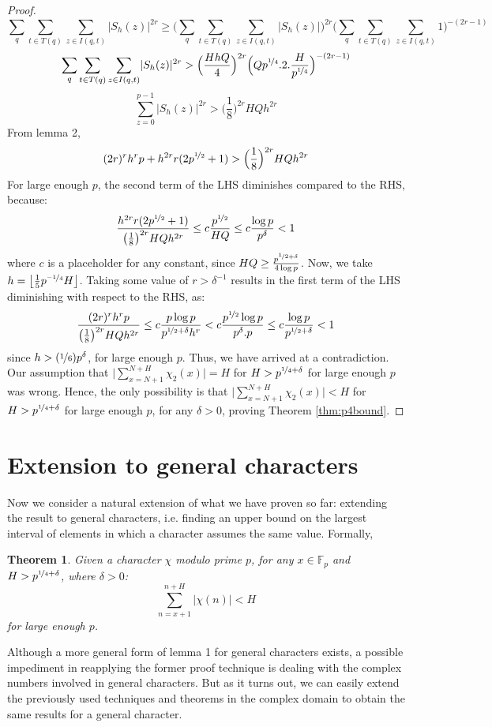 \documentclass{report}
\newtheorem{theorem}{Theorem}
\begin{document}
\begin{proof}
$$\sum_q\sum\limits_{t\in T(q)}\sum\limits_{z\in I(q,t)}\lvert S_h(z) \rvert^{2r} \geq \bigg ( \sum_q\sum\limits_{t\in T(q)}\sum\limits_{z\in I(q,t)}\lvert S_h(z) \rvert \bigg )^{2r} \bigg ( \sum_q\sum\limits_{t\in T(q)}\sum\limits_{z\in I(q,t)}1 \bigg )^{-(2r-1)}$$
$$\sum_q\sum\limits_{t\in T(q)}\sum\limits_{z\in I(q,t)}\lvert S_h(z) \rvert^{2r} > \Big( \frac{HhQ}{4}\Big)^{2r}\Big ( Qp^{\nicefrac{1}{4}}.2.\frac{H}{p^{\nicefrac{1}{4}}}\Big )^{-(2r-1)}$$
$$\sum\limits_{z=0}^{p-1}\lvert S_h(z) \rvert^{2r}>\Big(\frac{1}{8}\Big)^{2r}HQh^{2r}$$
From lemma 2,
$$(2r)^{r}h^{r}p+h^{2r}r(2p^{\nicefrac{1}{2}}+1)>\Big(\frac{1}{8}\Big)^{2r}HQh^{2r}$$
For large enough $p$, the second term of the LHS diminishes compared to the RHS, because:
\[ \frac{h^{2r}r(2p^{\nicefrac{1}{2}}+1)}{\big(\frac{1}{8}\big)^{2r}HQh^{2r}} \leq c\frac{p^{\nicefrac{1}{2}}}{HQ} \leq c\frac{\log p}{p^{\delta}} < 1\]
where $c$ is a placeholder for any constant, since $HQ\geq \frac{p^{\nicefrac{1}{2}+\delta}}{4\log p}$. Now, we take $h=\left \lfloor \frac{1}{5}p^{\nicefrac{-1}{4}}H \right \rfloor$. Taking some value of $r>\delta^{-1}$ results in the first term of the LHS diminishing with respect to the RHS, as:
\[\frac{(2r)^{r}h^{r}p}{\big(\frac{1}{8}\big)^{2r}HQh^{2r}} \leq c \frac{p\log p}{p^{\nicefrac{1}{2}+\delta}h^r} < c\frac{p^{\nicefrac{1}{2}}\log p}{p^{\delta}.p} \leq c\frac{\log p}{p^{\nicefrac{1}{2}+\delta}} < 1\]
since $h>(\nicefrac{1}{6})p^{\delta}$, for large enough $p$. Thus, we have arrived at a contradiction. Our assumption that $\Big \lvert \sum\limits_{x=N+1}^{N+H}\chi_2(x)\Big \rvert=H$ for $H>p^{\nicefrac{1}{4}+\delta}$ for large enough $p$ was wrong. Hence, the only possibility is that $\Big \lvert \sum\limits_{x=N+1}^{N+H}\chi_2(x)\Big \rvert<H$ for $H>p^{\nicefrac{1}{4}+\delta}$ for large enough $p$, for any $\delta>0$, proving Theorem \ref{thm:p4bound}.
\end{proof}
%
%
\section{Extension to general characters}
%
%
Now we consider a natural extension of what we have proven so far: extending the result to general characters, i.e. finding an upper bound on the largest interval of elements in which a character assumes the same value. Formally,
\begin{theorem} \label{thm:genp4bound}
Given a character $\chi$ modulo prime $p$, for any $x\in\mathbb{F}_p$ and $H>p^{\nicefrac{1}{4}+\delta}$, where $\delta>0$:
\[\sum\limits_{n=x+1}^{n+H}\lvert\chi(n)\rvert<H\]
for large enough $p$.
\end{theorem}
Although a more general form of lemma 1 for general characters exists, a possible impediment in reapplying the former proof technique is dealing with the complex numbers involved in general characters. But as it turns out, we can easily extend the previously used techniques and theorems in the complex domain to obtain the same results for a general character.
\end{document}
